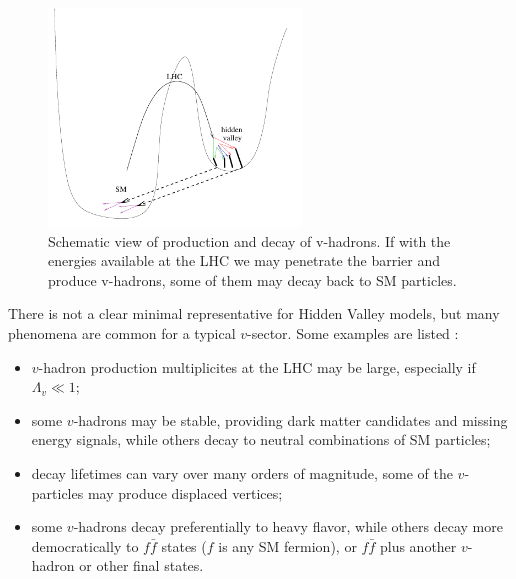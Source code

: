 \begin{figure}[htbp]
\centering
\includegraphics[width=0.6\textwidth]{plots/intro/hiddenvalley.pdf}
\caption{Schematic view of production and decay of v-hadrons. If with the energies
available at the LHC we may penetrate the barrier and produce v-hadrons, some of them may
decay back to SM particles. \label{fig:hv}}
\end{figure}

There is not a clear minimal representative for Hidden Valley models, but
many phenomena are common for a typical $v$-sector. Some examples are listed
\cite{Strassler:2006ri,Han:2007ae,Strassler:2008fv}:
\begin{itemize}
\item $v$-hadron production multiplicites at the LHC may be large, especially if $\Lambda_v\ll1$\TeV;
\item some $v$-hadrons may be stable, providing dark matter candidates and missing energy signals,
while others decay to neutral combinations of SM particles;
\item decay lifetimes can vary over many orders of magnitude, some of the $v$-particles may produce
displaced vertices;
\item some $v$-hadrons decay preferentially to heavy flavor, while others decay more democratically
to $f\bar{f}$ states ($f$ is any SM fermion), or $f\bar{f}$ plus another $v$-hadron or other final
states.
\end{itemize}

